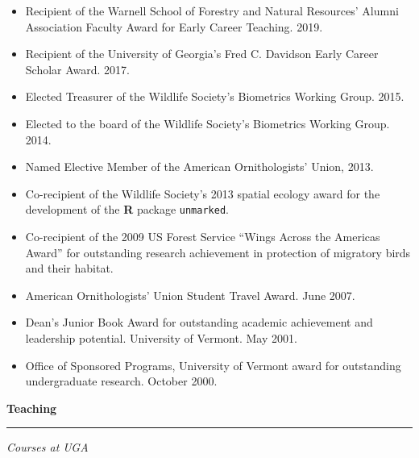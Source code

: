 \begin{itemize}

\item Recipient of the Warnell School of Forestry and Natural
  Resources' Alumni Association Faculty Award for Early Career
  Teaching. 2019. 
  
\item Recipient of the University of Georgia's Fred C. Davidson Early
  Career Scholar Award. 2017. 

\item Elected Treasurer of the Wildlife Society's Biometrics Working
  Group. 2015. 

\item Elected to the board of the Wildlife Society's Biometrics
  Working Group. 2014. 

\item Named Elective Member of the American Ornithologists' Union,
  2013. 

\item Co-recipient of the Wildlife Society's 2013 spatial ecology award for
  the development of the {\bf R} package {\tt unmarked}.

\item Co-recipient of the 2009 US Forest Service ``Wings Across the Americas Award''
for outstanding research achievement in protection of
migratory birds and their habitat.

\item American Ornithologists' Union Student Travel Award. June 2007.

\item Dean's Junior Book Award for outstanding academic achievement
  and leadership potential. University of Vermont. May 2001.

\item Office of Sponsored Programs, University of Vermont award for
  outstanding undergraduate research. October 2000.

\end{itemize}


\vspace{0.5cm}






{\large \bf Teaching} \\
\rule[3mm]{\textwidth}{0.3mm}

{\it Courses at UGA}

